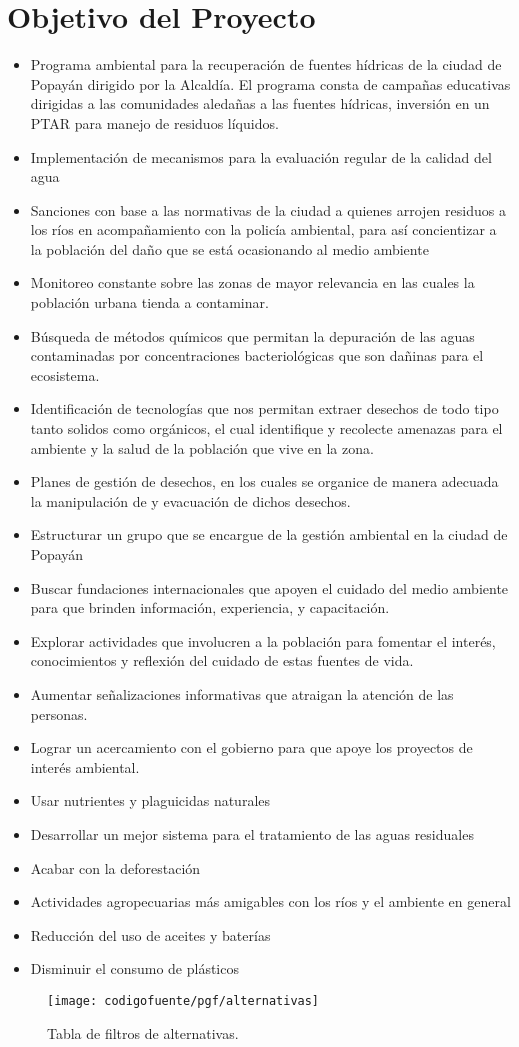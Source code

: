 \section{Objetivo del Proyecto}
\begin{itemize}
	\item Programa ambiental para la recuperación de fuentes hídricas de la ciudad de Popayán dirigido por la Alcaldía. El programa consta de campañas educativas dirigidas a las comunidades aledañas a las fuentes hídricas, inversión en un PTAR para manejo de residuos líquidos.
	\item Implementación de mecanismos para la evaluación regular de la calidad del agua
	\item Sanciones con base a las normativas de la ciudad a quienes arrojen residuos a los ríos en acompañamiento con la policía ambiental, para así concientizar a la población del daño que se está ocasionando al medio ambiente
	\item Monitoreo constante sobre las zonas de mayor relevancia en las cuales la población urbana tienda a contaminar.
	\item Búsqueda de métodos químicos que permitan la depuración de las aguas contaminadas por concentraciones bacteriológicas que son dañinas para el ecosistema.
	\item Identificación de tecnologías que nos permitan extraer desechos de todo tipo tanto solidos como orgánicos, el cual identifique y recolecte amenazas para el ambiente y la salud de la población que vive en la zona.
	\item Planes de gestión de desechos, en los cuales se organice de manera adecuada la manipulación de y evacuación de dichos desechos.
	\item Estructurar un grupo que se encargue de la gestión ambiental en la ciudad de Popayán
	\item Buscar fundaciones internacionales que apoyen el cuidado del medio ambiente para que brinden información, experiencia, y capacitación.
	\item Explorar actividades que involucren a la población para fomentar el interés, conocimientos y reflexión del cuidado de estas fuentes de vida.
	\item Aumentar señalizaciones informativas que atraigan la atención de las personas.
	\item Lograr un acercamiento con el gobierno para que apoye los proyectos de interés ambiental.
	\item Usar nutrientes y plaguicidas naturales
	\item Desarrollar un mejor sistema para el tratamiento de las aguas residuales
	\item Acabar con la deforestación
	\item Actividades agropecuarias más amigables con los ríos y el ambiente en general
	\item Reducción del uso de aceites y baterías
	\item Disminuir el consumo de plásticos
\end{itemize}

\begin{figure}[H]
	\centering
	\texttt{[image: codigofuente/pgf/alternativas]}
	\caption{Tabla de filtros de alternativas.}
	\label{fig:alt}
\end{figure}
